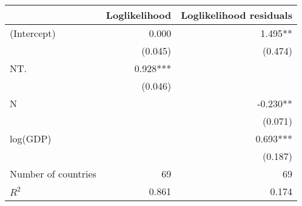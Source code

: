 \begin{tabular}{|l||r|r|}
\hline
                    & \multicolumn{1}{c|}{Loglikelihood} & \multicolumn{1}{c|}{Loglikelihood residuals} \\ 
\hline
\hline
(Intercept)         &                             0.000 &                                     1.495** \\ 
                    &                           (0.045) &                                     (0.474) \\
NT.                 &                          0.928*** &                                             \\ 
                    &                           (0.046) &                                             \\
N                   &                                   &                                    -0.230** \\ 
                    &                                   &                                     (0.071) \\
log(GDP)            &                                   &                                    0.693*** \\ 
                    &                                   &                                     (0.187) \\
\hline
\hline
Number of countries &                                69 &                                          69 \\
\hline
$R^2$               &                             0.861 &                                       0.174 \\ 
\hline
\end{tabular}